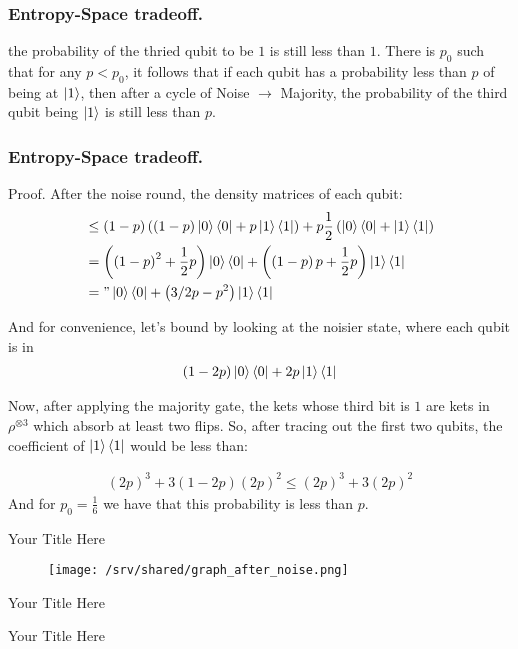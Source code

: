 \documentclass{beamer}
\begin{document}
\begin{frame}
  \frametitle{Entropy-Space tradeoff.}
  the probability of the thried qubit to be $1$ is still less than $1$. 
  There is $p_{0}$ such that for any $p < p_{0}$, it follows that if each qubit has a probability less than $p$ of being at $\ket{1}$, then after a cycle of Noise $\rightarrow$ Majority, the probability of the third qubit being $\ket{1}$ is still less than $p$.


\end{frame}
\begin{frame}
  \frametitle{Entropy-Space tradeoff.}
Proof. After the noise round, the density matrices of each qubit:
  \begin{equation*}
    \begin{split}
      &\le \left( 1- p \right)\left(  \left( 1 -p \right) \ket{0}\bra{0} + p\ket{1}\bra{1}  \right) + p \frac{1}{2}\left( \ket{0}\bra{0} + \ket{1}\bra{1} \right) \\ 
      &= \left( \left( 1-p \right)^{2} + \frac{1}{2}p \right)\ket{0}\bra{0} + \left( \left( 1-p \right)p + \frac{1}{2}p \right)\ket{1}\bra{1} \\
      &= " \ket{0}\bra{0} + \left( 3/2 p - p^{2} \right) \ket{1}\bra{1} 
    \end{split}
  \end{equation*}

And for convenience, let's bound by looking at the noisier state, where each qubit is in
  \begin{equation*}
    \begin{split}
      \left( 1 - 2p \right)\ket{0}\bra{0} + 2p \ket{1}\bra{1}
    \end{split}
  \end{equation*}

Now, after applying the majority gate, the kets whose third bit is $1$ are kets in $\rho^{\otimes 3}$ which absorb at least two flips. So, after tracing out the first two qubits, the coefficient of $\ket{1}\bra{1}$ would be less than:

  \begin{equation*}
    \begin{split}
      \left( 2p \right)^{3} + 3\left( 1 - 2p \right) \left( 2p \right)^2 \le \left( 2p \right)^{3} + 3\left( 2p \right)^2 
    \end{split}
  \end{equation*}
  And for $p_0 = \frac{1}{6}$ we have that this probability is less than $p$. 

\end{frame}




\begin{frame}{Your Title Here}

    \begin{figure}
        \centering
        \texttt{[image: /srv/shared/graph\_after\_noise.png]}
    \end{figure}
\end{frame}

\begin{frame}{Your Title Here}

\end{frame}

\begin{frame}{Your Title Here}

\end{frame}
\end{document}
